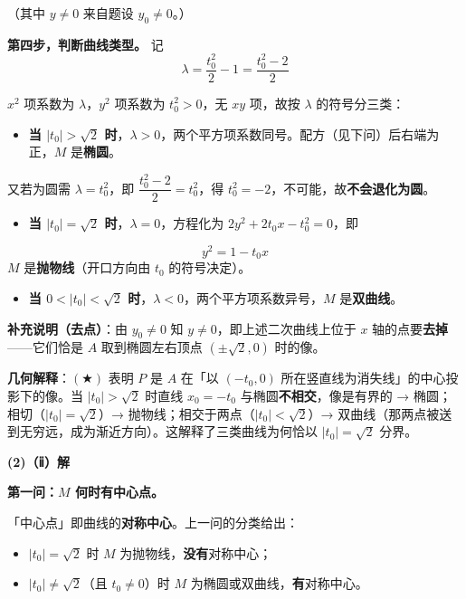 （其中 $y\ne0$ 来自题设 $y_0\ne0$。）

\textbf{第四步，判断曲线类型。} 记
\[\lambda=\frac{t_0^2}{2}-1=\frac{t_0^2-2}{2}\]

$x^2$ 项系数为 $\lambda$，$y^2$ 项系数为 $t_0^2>0$，无 $xy$ 项，故按 $\lambda$ 的符号分三类：

\begin{itemize}
\item \textbf{当 $\left|t_0\right|>\sqrt2$ 时}，$\lambda>0$，两个平方项系数同号。配方（见下问）后右端为正，$M$ 是\textbf{椭圆}。
\end{itemize}
  又若为圆需 $\lambda=t_0^2$，即 $\dfrac{t_0^2-2}{2}=t_0^2$，得 $t_0^2=-2$，不可能，故\textbf{不会退化为圆}。
\begin{itemize}
\item \textbf{当 $\left|t_0\right|=\sqrt2$ 时}，$\lambda=0$，方程化为 $2y^2+2t_0x-t_0^2=0$，即
\end{itemize}
\[y^2=1-t_0x\]
  $M$ 是\textbf{抛物线}（开口方向由 $t_0$ 的符号决定）。
\begin{itemize}
\item \textbf{当 $0<\left|t_0\right|<\sqrt2$ 时}，$\lambda<0$，两个平方项系数异号，$M$ 是\textbf{双曲线}。
\end{itemize}

\textbf{补充说明（去点）}：由 $y_0\ne0$ 知 $y\ne0$，即上述二次曲线上位于 $x$ 轴的点要\textbf{去掉}——它们恰是 $A$ 取到椭圆左右顶点 $\left(\pm\sqrt2,0\right)$ 时的像。

\begin{gktip}
\textbf{几何解释}：$(\bigstar)$ 表明 $P$ 是 $A$ 在「以 $\left(-t_0,0\right)$ 所在竖直线为消失线」的中心投影下的像。当 $\left|t_0\right|>\sqrt2$ 时直线 $x_0=-t_0$ 与椭圆\textbf{不相交}，像是有界的 → 椭圆；相切（$\left|t_0\right|=\sqrt2$）→ 抛物线；相交于两点（$\left|t_0\right|<\sqrt2$）→ 双曲线（那两点被送到无穷远，成为渐近方向）。这解释了三类曲线为何恰以 $\left|t_0\right|=\sqrt2$ 分界。
\end{gktip}

\par\medskip

\textbf{(2)（ⅱ）解}

\textbf{第一问：$M$ 何时有中心点。}

「中心点」即曲线的\textbf{对称中心}。上一问的分类给出：
\begin{itemize}
\item $\left|t_0\right|=\sqrt2$ 时 $M$ 为抛物线，\textbf{没有}对称中心；
\item $\left|t_0\right|\ne\sqrt2$（且 $t_0\ne0$）时 $M$ 为椭圆或双曲线，\textbf{有}对称中心。
\end{itemize}

